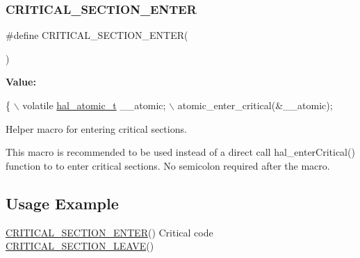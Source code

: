 \subsubsection{\texorpdfstring{C\+R\+I\+T\+I\+C\+A\+L\+\_\+\+S\+E\+C\+T\+I\+O\+N\+\_\+\+E\+N\+T\+ER}{CRITICAL\_SECTION\_ENTER}}
{\footnotesize\ttfamily \#define C\+R\+I\+T\+I\+C\+A\+L\+\_\+\+S\+E\+C\+T\+I\+O\+N\+\_\+\+E\+N\+T\+ER(\begin{DoxyParamCaption}{ }\end{DoxyParamCaption})}

{\bfseries Value\+:}
\begin{DoxyCode}
\{                                                                                                          
              \(\backslash\)
        volatile \hyperlink{group__doc__driver__hal__helper__atomic_ga6b3a0c9eea25111ac1877e0302e2fe1c}{hal\_atomic\_t} \_\_atomic;                                                        
                              \(\backslash\)
        atomic\_enter\_critical(&\_\_atomic);
\end{DoxyCode}


Helper macro for entering critical sections. 

This macro is recommended to be used instead of a direct call hal\+\_\+enter\+Critical() function to to enter critical sections. No semicolon required after the macro.\hypertarget{group__doc__driver__hal__helper__atomic_atomic_usage}{}\subsection{Usage Example}\label{group__doc__driver__hal__helper__atomic_atomic_usage}

\begin{DoxyCode}
\hyperlink{group__doc__driver__hal__helper__atomic_ga039bfe712b6ba4388a35672f54763391}{CRITICAL\_SECTION\_ENTER}()
Critical code
\hyperlink{group__doc__driver__hal__helper__atomic_ga6b32c9f95e7c6b604d621e215c514015}{CRITICAL\_SECTION\_LEAVE}()
\end{DoxyCode}
 \mbox{\label{group__doc__driver__hal__helper__atomic_ga6b32c9f95e7c6b604d621e215c514015}} 
